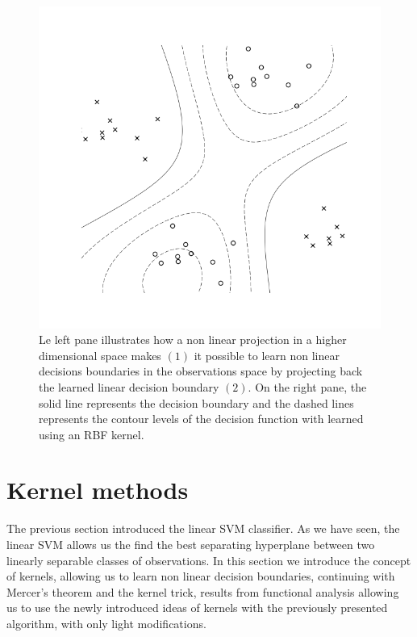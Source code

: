 \begin{figure}
  \begin{minipage}{.5\textwidth}
    \centering
    
  \end{minipage}%
  \begin{minipage}{.5\textwidth}
    \centering
    \includegraphics[width=\linewidth]{decision_boundary.png}
  \end{minipage}
  \caption{
    Le left pane illustrates how a non linear projection in a higher dimensional space makes $(1)$ it possible to learn non linear decisions boundaries in the observations space by projecting back the learned linear decision boundary $(2)$. On the right pane, the solid line represents the decision boundary and the dashed lines represents the contour levels of the decision function with learned using an RBF kernel.
  }
\end{figure}

\section{Kernel methods}

The previous section introduced the linear SVM classifier. As we have seen, the linear SVM  allows us the find the best separating hyperplane between two linearly separable classes of observations. In this section we introduce the concept of kernels, allowing us to learn non linear decision boundaries, continuing with Mercer's theorem and the kernel trick, results from functional analysis allowing us to use the newly introduced ideas of kernels with the previously presented algorithm, with only light modifications.


